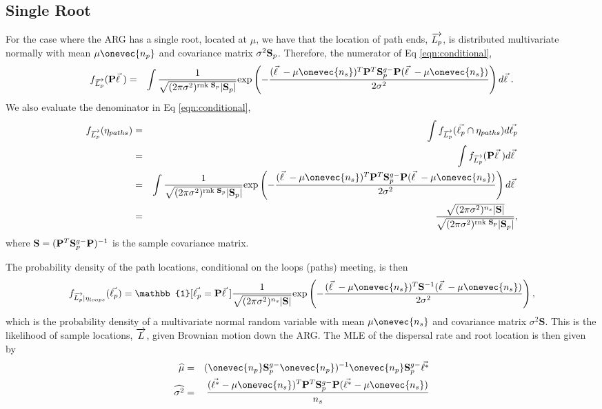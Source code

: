 \subsection{Single Root}
For the case where the ARG has a single root, located at $\mu$, we have that the location of path ends, $\overrightarrow{L_p}$, is distributed multivariate normally with mean $\mu \onevec{{n_p}}$ and covariance matrix $\sigma^2 \mathbf{S}_p$. Therefore, the numerator of Eq \ref{eqn:conditional},
\begin{eqnarray}
    \displaystyle f_{\Lpvec}(\Pp \lvec) 
  &=& \int \frac{1}{\sqrt{ (2\pi\sigma^2)^{\text{rnk }\spath} |\spath| }}\text{exp}\left( -\frac{(\lvec - \mu \onevec{{n_s}})^T \Pp^T\spathg\Pp (\lvec - \mu \onevec{{n_s}})}{2\sigma^2}\right)d\lvec.
\end{eqnarray}
We also evaluate the denominator in Eq \ref{eqn:conditional},
\begin{eqnarray}
  \displaystyle f_{\Lpvec}(\eta_{paths}) 
  &=& \int f_{\Lpvec}(\lpvec \cap \eta_{paths}) d\lpvec \\
  &=& \int f_{\Lpvec}(\Pp \lvec) d\lvec \\
  &=& \int \frac{1}{\sqrt{ (2\pi\sigma^2)^{\text{rnk }\spath} |\spath| }}\text{exp}\left( -\frac{(\lvec - \mu \onevec{{n_s}})^T \Pp^T\spathg\Pp (\lvec - \mu \onevec{{n_s}})}{2\sigma^2}\right)d\lvec \\
  &=& \frac{\sqrt{ (2\pi\sigma^2)^{n_s} |\mathbf{S}| }}{\sqrt{ (2\pi\sigma^2)^{\text{rnk }\spath} |\spath| }},
\end{eqnarray}
 where $\mathbf{S} = (\mathbf{P}^T\mathbf{S}_p^{g-}\mathbf{P})^{-1}$ is the sample covariance matrix.
 
 The probability density of the path locations, conditional on the loops (paths) meeting, is then
\begin{eqnarray}
    f_{\Lpvec|\eta_{loops}}(\lpvec) = \mathbb{1}[\lpvec = \Pp \lvec] \frac{1}{\sqrt{ (2\pi\sigma^2)^{n_s} |\mathbf{S}| }}\text{exp}\left( -\frac{(\lvec - \mu \onevec{{n_s}})^T \mathbf{S}^{-1}(\lvec - \mu \onevec{{n_s}})}{2\sigma^2}\right),
\end{eqnarray}
which is the probability density of a multivariate normal random variable with mean $\mu \onevec{{n_s}}$ and covariance matrix $\sigma^2\mathbf{S}$. This is the likelihood of sample locations, $\overrightarrow{L}$, given Brownian motion down the ARG. The MLE of the dispersal rate and root location is then given by 
\begin{eqnarray}
\label{eqn:MLE}
    \widehat{\mu} &=& (\onevec{{n_p}}\spathg\onevec{{n_p}})^{-1}\onevec{{n_p}}\spathg\ldata \\
    \widehat{\sigma^2} &=& \frac{(\ldata - \mu\onevec{{n_s}})^T\Pp^T\spathg\Pp(\ldata - \mu\onevec{{n_s}})}{n_s}
\end{eqnarray}

